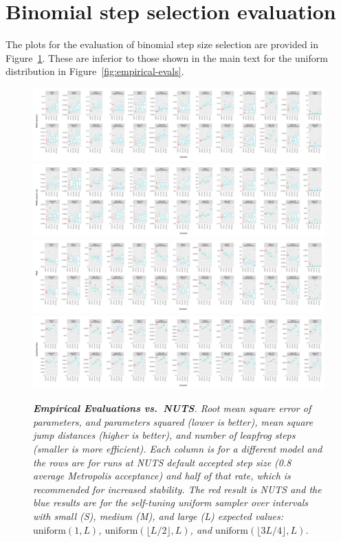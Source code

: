 
\section{Binomial step selection evaluation}\label{app:binomial-eval}

The plots for the evaluation of binomial step size selection are provided in Figure~\ref{fig:empirical-evals-binomial}.  These are inferior to those shown in the main text for the uniform distribution in Figure~\ref{fig:empirical-evals}.

\begin{figure}
    \centering
    \includegraphics[width=\textwidth]{img/results/uniform/vs_nuts_RMSE_param.pdf}
    \includegraphics[width=\textwidth]{img/results/uniform/vs_nuts_RMSE_param_sq.pdf}
    \includegraphics[width=\textwidth]{img/results/uniform/vs_nuts_MSJD.pdf}
    \includegraphics[width=\textwidth]{img/results/uniform/vs_nuts_Leapfrog_Steps.pdf}
    \caption{\it {\bfseries Empirical Evaluations vs.~NUTS}. Root mean square error of parameters, and parameters squared (lower is better), mean square jump distances (higher is better), and number of leapfrog steps (smaller is more efficient).  Each column is for a different model and the rows are for runs at NUTS default accepted step size (0.8 average Metropolis acceptance) and half of that rate, which is recommended for increased stability. The red result is NUTS and the blue results are for the self-tuning uniform sampler over intervals with small (S), medium (M), and large (L) expected values: $\textrm{uniform}(1, L)$, $\textrm{uniform}(\lfloor{L / 2}\rfloor, L)$, and $\textrm{uniform}(\lfloor{3L / 4}\rfloor, L)$.}
    \label{fig:empirical-evals-binomial}
\end{figure}